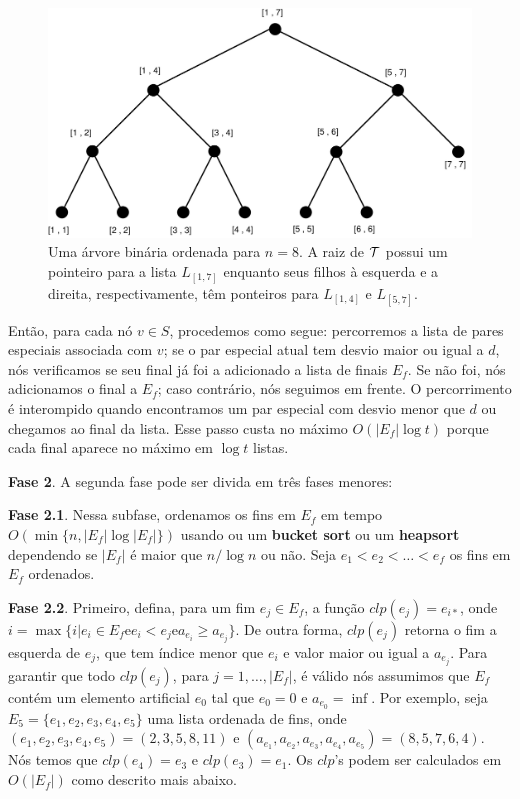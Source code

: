 \documentclass[12pt]{article}
\begin{document}
\begin{figure}[htp]
\begin{center}
\includegraphics[scale=0.2]{arvore.pdf}
\caption{Uma árvore binária ordenada para $n = 8$. A raiz de ${\cal T}$ possui um pointeiro para a lista $L_{[1,7]}$ enquanto seus filhos à esquerda 
e a direita, respectivamente, têm ponteiros para $L_{[1,4]}$ e $L_{[5,7]}$. }
\label{fig:binary_tree}
\end{center}
\end{figure}



Então, para cada nó $v \in S$,  procedemos como segue: percorremos a lista de pares especiais associada
com $v$; se o par especial atual tem desvio maior ou igual a $d$, nós verificamos se seu final já foi a adicionado a lista de finais $E_f$. Se não foi, nós adicionamos o final a $E_f$; caso contrário, nós seguimos
em frente. O percorrimento é interompido quando encontramos um par especial com desvio menor que $d$
ou chegamos ao final da lista. Esse passo custa no máximo $O(|E_f| \log t)$ porque cada final aparece no máximo
em $\log t$ listas.

\textbf{Fase 2}. A segunda fase pode ser divida em três fases menores:

\textbf{Fase 2.1}. Nessa subfase, ordenamos os fins em $E_f$ em tempo $O(\min\{n, |E_f|\log|E_f|\})$  
usando ou um \textbf{bucket sort} ou um \textbf{heapsort} dependendo se $|E_f|$ é maior que $n/\log n$ ou
não. Seja $e_1 < e_2 < \ldots < e_f$ os fins em $E_f$ ordenados.

\textbf{Fase 2.2}. Primeiro, defina, para um fim $e_j \in E_f$, a função $clp(e_j) = e_{i*}$,
onde $i = \max\{i|e_i \in E_f \text{e} e_i < e_j \text{e} a_{e_i} \ge a_{e_j}\}$. De outra forma,
$clp(e_j)$ retorna o fim a esquerda de $e_j$, que tem índice menor que $e_i$ e valor maior ou 
igual a $a_{e_j}$. Para garantir que todo $clp(e_j)$, para $j = 1, \ldots, |E_f|$, é válido nós
assumimos que $E_f$ contém um elemento artificial $e_0$ tal que $e_0 = 0$ e $a_{e_0} = \inf$.
Por exemplo, seja $E_5 = \{e_1, e_2, e_3, e_4, e_5\}$ uma lista ordenada de fins, onde 
$(e_1, e_2, e_3, e_4, e_5) = (2,3,5,8, 11)$ e $(a_{e_1}, a_{e_2}, a_{e_3}, a_{e_4}, a_{e_5}) = (8,5,7,6,4)$.
Nós temos que $clp(e_4) = e_3$ e $clp(e_3) = e_1$. Os $clp$'s podem ser calculados em $O(|E_f|)$ como
descrito mais abaixo. 
\end{document}
